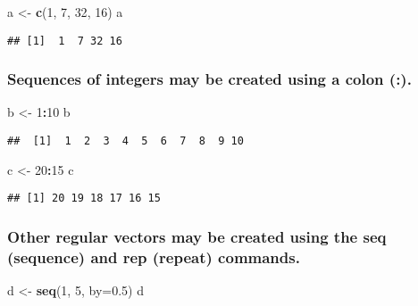 \documentclass[]{article}
\newenvironment{Shaded}{\begin{snugshade}}{\end{snugshade}}
\newcommand{\KeywordTok}[1]{\textcolor[rgb]{0.13,0.29,0.53}{\textbf{#1}}}
\newcommand{\DataTypeTok}[1]{\textcolor[rgb]{0.13,0.29,0.53}{#1}}
\newcommand{\DecValTok}[1]{\textcolor[rgb]{0.00,0.00,0.81}{#1}}
\newcommand{\FloatTok}[1]{\textcolor[rgb]{0.00,0.00,0.81}{#1}}
\newcommand{\StringTok}[1]{\textcolor[rgb]{0.31,0.60,0.02}{#1}}
\newcommand{\OperatorTok}[1]{\textcolor[rgb]{0.81,0.36,0.00}{\textbf{#1}}}
\newcommand{\NormalTok}[1]{#1}
\begin{document}
\begin{Shaded}
\begin{Highlighting}[]
\NormalTok{a <-}\StringTok{ }\KeywordTok{c}\NormalTok{(}\DecValTok{1}\NormalTok{, }\DecValTok{7}\NormalTok{, }\DecValTok{32}\NormalTok{, }\DecValTok{16}\NormalTok{)}
\NormalTok{a}
\end{Highlighting}
\end{Shaded}

\begin{verbatim}
## [1]  1  7 32 16
\end{verbatim}

\subsubsection{Sequences of integers may be created using a colon
(:).}\label{sequences-of-integers-may-be-created-using-a-colon-.}

\begin{Shaded}
\begin{Highlighting}[]
\NormalTok{b <-}\StringTok{ }\DecValTok{1}\OperatorTok{:}\DecValTok{10}
\NormalTok{b}
\end{Highlighting}
\end{Shaded}

\begin{verbatim}
##  [1]  1  2  3  4  5  6  7  8  9 10
\end{verbatim}

\begin{Shaded}
\begin{Highlighting}[]
\NormalTok{c <-}\StringTok{ }\DecValTok{20}\OperatorTok{:}\DecValTok{15}
\NormalTok{c}
\end{Highlighting}
\end{Shaded}

\begin{verbatim}
## [1] 20 19 18 17 16 15
\end{verbatim}

\subsubsection{Other regular vectors may be created using the seq
(sequence) and rep (repeat)
commands.}\label{other-regular-vectors-may-be-created-using-the-seq-sequence-and-rep-repeat-commands.}

\begin{Shaded}
\begin{Highlighting}[]
\NormalTok{d <-}\StringTok{ }\KeywordTok{seq}\NormalTok{(}\DecValTok{1}\NormalTok{, }\DecValTok{5}\NormalTok{, }\DataTypeTok{by=}\FloatTok{0.5}\NormalTok{)}
\NormalTok{d}
\end{Highlighting}
\end{Shaded}
\end{document}
